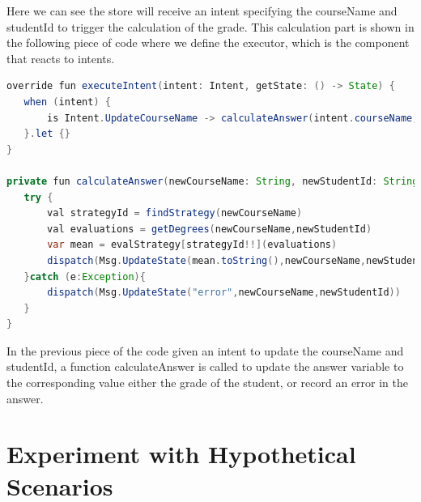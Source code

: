 Here we can see the store will receive an intent specifying the courseName and studentId to trigger the calculation of the grade. This calculation part is shown in the following piece of code where we define the executor, which is the component that reacts to intents.

\begin{lstlisting}[language=java]
override fun executeIntent(intent: Intent, getState: () -> State) {
   when (intent) {
       is Intent.UpdateCourseName -> calculateAnswer(intent.courseName, intent.studentId)
   }.let {}
}

private fun calculateAnswer(newCourseName: String, newStudentId: String) {
   try {
       val strategyId = findStrategy(newCourseName)
       val evaluations = getDegrees(newCourseName,newStudentId)
       var mean = evalStrategy[strategyId!!](evaluations)
       dispatch(Msg.UpdateState(mean.toString(),newCourseName,newStudentId))
   }catch (e:Exception){
       dispatch(Msg.UpdateState("error",newCourseName,newStudentId))
   }
}

\end{lstlisting}

In the previous piece of the code given an intent to update the courseName and studentId, a function calculateAnswer is called to update the answer variable to the corresponding value either the grade of the student, or record an error in the answer.

\section{Experiment with Hypothetical Scenarios}



\endinput

